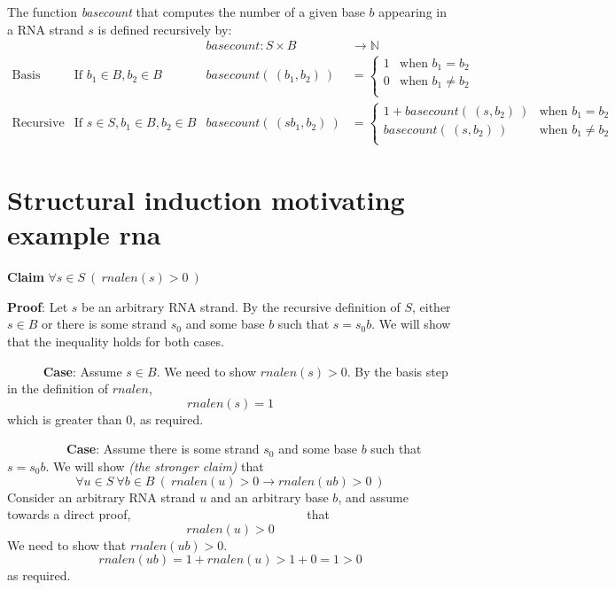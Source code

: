 \documentclass[12pt, oneside]{article}
\begin{document}
The function \textit{basecount} that computes the number of a given base 
$b$ appearing in a RNA strand $s$ is defined recursively by:
\[
\begin{array}{llll}
& & \textit{basecount} : S \times B & \to \mathbb{N} \\
\textrm{Basis Step:} &  \textrm{If } b_1 \in B, b_2 \in B & \textit{basecount}(~(b_1, b_2)~) & =
        \begin{cases}
            1 & \textrm{when } b_1 = b_2 \\
            0 & \textrm{when } b_1 \neq b_2 \\
        \end{cases} \\
\textrm{Recursive Step:} & \textrm{If } s \in S, b_1 \in B, b_2 \in B &\textit{basecount}(~(s b_1, b_2)~) & =
        \begin{cases}
            1 + \textit{basecount}(~(s, b_2)~) & \textrm{when } b_1 = b_2 \\
            \textit{basecount}(~(s, b_2)~) & \textrm{when } b_1 \neq b_2 \\
        \end{cases}
\end{array}
\] \vfill
\section*{Structural induction motivating example rna}


{\bf Claim} $\forall s \in S ~(~rnalen(s) > 0~)$

{\bf Proof}: Let $s$ be an arbitrary RNA strand. By the recursive definition of $S$,
either $s \in B$ or there is some strand $s_0$ and some base $b$ such that $s = s_0 b$.
We will show that the inequality holds for both cases.

{$\phantom{Basis}$} {\bf Case}: Assume $s \in B$. We need to show $rnalen(s) > 0$. 
By the basis step in the definition of $rnalen$,
$$rnalen(s) = 1$$
which is greater than $0$, as required.

{$\phantom{Recursive}$} {\bf Case}: Assume there is some strand $s_0$ and some base $b$ 
such that $s = s_0 b$. We will show {\it (the stronger claim)} that 
\[
    \forall u \in S ~\forall b \in B ~( ~\textit{rnalen}(u) >0  \to 
    \textit{rnalen}(ub) >0 ~)
\]
Consider an arbitrary RNA strand $u$ and an arbitrary base $b$, and assume towards a
direct proof,$~~{\phantom{ this is the induction hypothesis}}~~$ that
\[
    rnalen(u) > 0
\]
We need to show that $rnalen(ub) > 0$.
\[
    rnalen(ub) = 1 + rnalen (u) > 1 + 0 = 1 > 0
\]
as required. \vfill
\end{document}
